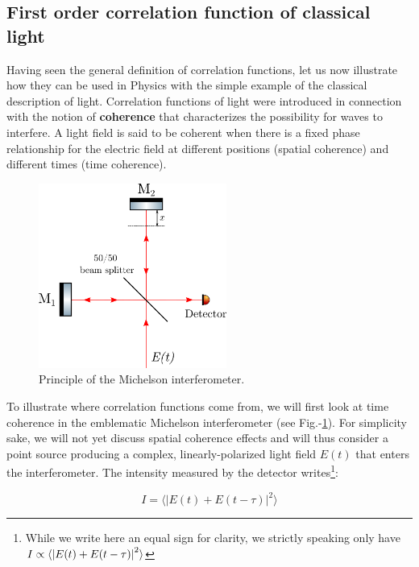 \subsection{First order correlation function of classical light}

Having seen the general definition of correlation functions, let us now illustrate how they can be used in Physics with the simple example of the classical description of light. Correlation functions of light were introduced in connection with the notion of \textbf{coherence} that characterizes the possibility for waves to interfere. A light field is said to be coherent when there is a fixed phase relationship for the electric field at different positions (spatial coherence) and different times (time coherence). 


\begin{figure}
    \centering
    \includegraphics[width=0.55\textwidth]{Fig/Chapter1/michelson.png}
    \caption{Principle of the Michelson interferometer.}
    \label{fig:michelson}
\end{figure}


To illustrate where correlation functions come from, we will first look at time coherence in the emblematic Michelson interferometer (see Fig.-\ref{fig:michelson}). For simplicity sake, we will not yet discuss spatial coherence effects and will thus consider a point source producing a complex, linearly-polarized light field $E(t)$ that enters the interferometer. The intensity measured by the detector writes\footnote{While we write here an equal sign for clarity, we strictly speaking only have $I \propto \langle\left\lvert E(t)+E(t-\tau)\right\rvert^2\rangle$}:

\begin{equation}
    I= \langle \lvert E(t)+E(t-\tau)\lvert^2 \rangle
    \label{eq:i_michelson}
\end{equation}

